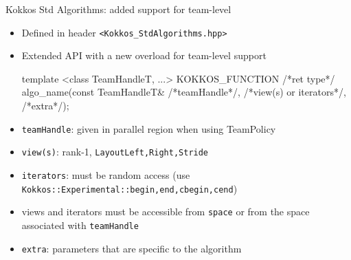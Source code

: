
\begin{frame}[fragile]{Kokkos Std Algorithms: added support for team-level}

\begin{itemize}
\item Defined in header \texttt{<Kokkos\_StdAlgorithms.hpp>}
\item Extended API with a new overload for team-level support

\begin{code}[keywords={sort}]
template <class TeamHandleT, ...>
KOKKOS_FUNCTION
/*ret type*/ algo_name(const TeamHandleT& /*teamHandle*/,
                       /*view(s) or iterators*/,
                       /*extra*/);
\end{code}

\item \texttt{teamHandle}: given in parallel region when using TeamPolicy

\item \texttt{view(s)}: rank-1, \texttt{LayoutLeft,Right,Stride}

\item \texttt{iterators}: must be random access (use \texttt{Kokkos::Experimental::begin,end,cbegin,cend})

\item views and iterators must be accessible from \texttt{space} or from the space associated with \texttt{teamHandle}

\item \texttt{extra}: parameters that are specific to the algorithm

\end{itemize}

\end{frame}
